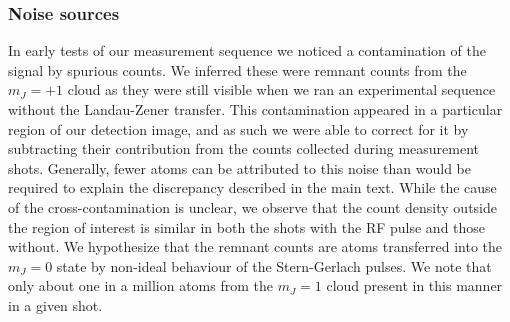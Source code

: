 	

	



\subsubsection{Noise sources}
\label{sec:spinpop}

	In early tests of our measurement sequence we noticed a contamination of the signal by spurious counts. 
	We inferred these were remnant counts from the $m_J=+1$ cloud as they were still visible when we ran an experimental sequence without the Landau-Zener transfer. 
	This contamination appeared in a particular region of our detection image, and as such we were able to correct for it by subtracting their contribution from the counts collected during measurement shots. 
	Generally, fewer atoms can be attributed to this noise than would be required to explain the discrepancy described in the main text. 
	While the cause of the cross-contamination is unclear, we observe that the count density outside the region of interest is similar in both the shots with the RF pulse and those without. 
	We hypothesize that the remnant counts are atoms transferred into the $m_J=0$ state by non-ideal behaviour of the Stern-Gerlach pulses. 
	We note that only about one in a million atoms from the $m_J=1$ cloud present in this manner in a given shot.

